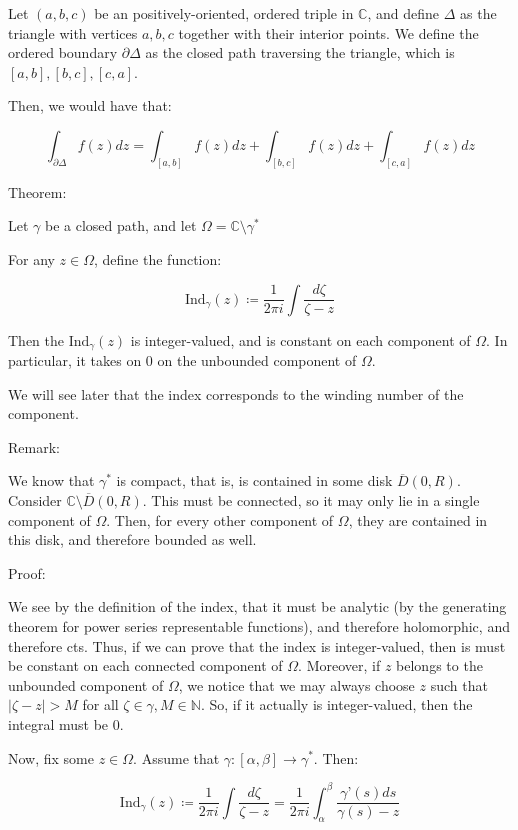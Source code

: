 \documentclass[10pt]{article}
\begin{document}
Let $(a,b,c)$ be an positively-oriented, ordered triple in $\mathbb{C}$, and define $\Delta$ as the triangle with vertices $a,b,c$ together with their interior points. We define the ordered boundary $\partial \Delta$ as the closed path traversing the triangle, which is $[a,b], [b,c], [c,a]$.

Then, we would have that:

$$ \int_{\partial \Delta} f(z) dz = \int_{[a,b]} f(z)dz +  \int_{[b,c]} f(z)dz  +  \int_{[c,a]} f(z)dz $$

Theorem:

Let $\gamma$ be a closed path, and let $\Omega = \mathbb{C} \setminus \gamma^*$

For any $z \in \Omega$, define the function:

$$\text{Ind}_\gamma(z) \coloneqq \frac{1}{2\pi i} \int \frac{d\zeta}{\zeta - z}$$

Then the $\text{Ind}_\gamma(z)$ is integer-valued, and is constant on each component of $\Omega$. In particular, it takes on $0$ on the unbounded component of $\Omega$.

We will see later that the index corresponds to the winding number of the component.

Remark:

We know that $\gamma^*$ is compact, that is, is contained in some disk $\overline{D}(0,R)$. Consider $\mathbb{C} \setminus \overline{D}(0,R)$. This must be connected, so it may only lie in a single component of $\Omega$. Then, for every other component of $\Omega$, they are contained in this disk, and therefore bounded as well.

Proof:

We see by the definition of the index, that it must be analytic (by the generating theorem for power series representable functions), and therefore holomorphic, and therefore cts. Thus, if we can prove that the index is integer-valued, then is must be constant on each connected component of $\Omega$. Moreover, if $z$ belongs to the unbounded component of $\Omega$, we notice that we may always choose $z$ such that $|\zeta - z| > M$ for all $\zeta \in \gamma, M \in \mathbb{N}$. So, if it actually is integer-valued, then the integral must be 0.

Now, fix some $z \in \Omega$. Assume that $\gamma: [\alpha, \beta] \to \gamma^*$. Then:

$$\text{Ind}_\gamma(z) \coloneqq \frac{1}{2\pi i} \int \frac{d\zeta}{\zeta - z} = \frac{1}{2\pi i} \int_\alpha^\beta \frac{\gamma’(s) ds}{\gamma(s)- z}$$
\end{document}

